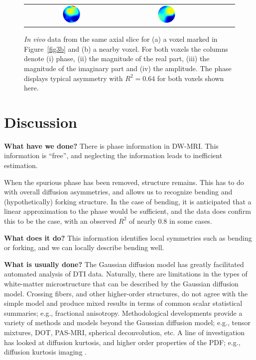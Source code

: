 \documentclass[authoryear,preprint,12pt]{elsarticle}
\begin{document}
\begin{figure}[!htbp]
\begin{center}
\begin{tabular}{c|cccc}
      \includegraphics[width=0.2\textwidth]{73106.ps} & 
      \includegraphics[width=0.2\textwidth]{73107.ps}
    \end{tabular}
  \end{center}
  \caption{\textit{In vivo} data from the same axial slice for (a) a
    voxel marked in Figure~\ref{fig3b} and (b) a nearby voxel.  For
    both voxels the columns denote (i) phase, (ii) the magnitude of
    the real part, (iii) the magnitude of the imaginary part and (iv)
    the amplitude.  The phase displays typical asymmetry with
    $R^2=0.64$ for both voxels shown here.}
  \label{fig6}
\end{figure}

\section{Discussion}
\label{discussion}

\textbf{What have we done?}  There is phase information in DW-MRI.
This information is ``free'', and neglecting the information leads to
inefficient estimation.

When the spurious phase has been removed, structure remains.  This has
to do with overall diffusion asymmetries, and allows us to recognize
bending and (hypothetically) forking structure. In the case of bending,
it is anticipated that a linear approximation to the phase would be
sufficient, and the data does confirm this to be the case, with an
observed $R^2$ of nearly 0.8 in some cases.

\textbf{What does it do?}  This information identifies local
symmetries such as bending or forking, and we can locally describe
bending well.

\textbf{What is usually done?}  The Gaussian diffusion model has
greatly facilitated automated analysis of DTI data.  Naturally, there
are limitations in the types of white-matter microstructure that can
be described by the Gaussian diffusion model.  Crossing fibers, and
other higher-order structures, do not agree with the simple model and
produce mixed results in terms of common scalar statistical summaries;
e.g., fractional anisotropy.  Methodological developments provide a
variety of methods and models beyond the Gaussian diffusion model;
e.g., tensor mixtures, DOT, PAS-MRI, spherical deconvolution, etc.  A
line of investigation has looked at diffusion kurtosis, and higher
order properties of the PDF; e.g., diffusion kurtosis imaging
\citep{Jensen2005}.
\end{document}
